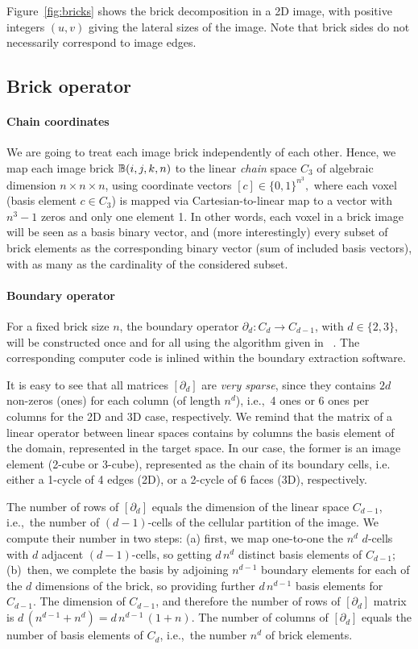 Figure~\ref{fig:bricks} shows the brick decomposition in a 2D image, with positive integers $(u,v)$ giving the lateral sizes of the image. Note that brick sides do not necessarily correspond to image edges. 


\subsection{Brick operator }\label{sec:brick}

\paragraph{Chain coordinates }\label{sec:chain-coords}
We are going to treat each image brick independently of each other. Hence, we map each image brick $\mathbb{B}(i,j,k,n)$ to the linear \emph{chain} space $C_3$ of algebraic dimension $n\times n\times n$, using coordinate vectors $[c] \in \{0,1\}^{n^3},$ where each voxel (basis element $c \in C_3$) is mapped via Cartesian-to-linear map to a vector with $n^3-1$ zeros and only one element 1.
In other words, each voxel in a brick image will be seen as a basis binary vector, and (more interestingly) every subset of brick elements as the corresponding binary vector (sum of included basis vectors), with as many as the cardinality of the considered  subset.

\paragraph{Boundary operator }\label{sec:boundary-operator}
For a fixed brick size $n$, the boundary operator $\partial_d : C_d\to C_{d-1}$, with $d\in\{2,3\}$, will be constructed once and for all using the algorithm given in~
\cite{TSAS}. 
The corresponding computer code is inlined within the boundary extraction software.

It is easy to see that all matrices $[\partial_d]$ are \emph{very sparse}, since they contains $2d$ non-zeros (ones) for each column (of length $n^d$), i.e.,~4 ones or 6 ones per columns for the 2D and 3D case, respectively. We remind that the matrix of a linear operator between linear spaces contains by columns the basis element of the domain, represented in the target space. In our case, the former is an image element (2-cube or 3-cube), represented as the chain of its boundary cells, i.e. either a 1-cycle of 4 edges (2D), or  a 2-cycle of 6 faces (3D), respectively.  

The number of rows of $[\partial_d]$ equals the dimension of the linear space $C_{d-1}$, i.e.,~the number of $(d-1)$-cells of the cellular partition of the image. We compute their number in two steps: (a) first, we map one-to-one the $n^d$ $d$-cells with $d$ adjacent $(d-1)$-cells, so getting $d\,n^d$ distinct basis elements of $C_{d-1}$; (b)~then, we complete the basis by adjoining $n^{d-1}$ boundary elements for each of the $d$ dimensions of the brick, so providing further $d\,n^{d-1}$ basis elements for $C_{d-1}$. The dimension of $C_{d-1}$, and therefore the number of rows of $[\partial_d]$ matrix is $d\,(n^{d-1}+n^{d}) = d\,n^{d-1}\,(1+n)$. The number of columns of $[\partial_d]$ equals the number of basis elements of $C_d$, i.e.,~the number $n^d$ of brick elements.

